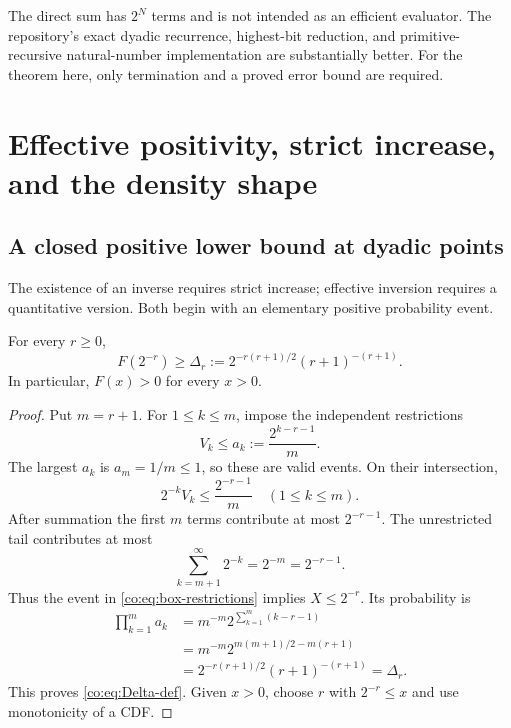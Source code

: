 \begin{remark}
The direct sum has $2^N$ terms and is not intended as an efficient evaluator.
The repository's exact dyadic recurrence, highest-bit reduction, and
primitive-recursive natural-number implementation are substantially better.
For the theorem here, only termination and a proved error bound are required.
\end{remark}

\section{Effective positivity, strict increase, and the density shape}

\subsection{A closed positive lower bound at dyadic points}

The existence of an inverse requires strict increase; effective inversion
requires a quantitative version.  Both begin with an elementary positive
probability event.

\begin{lemma}\label{co:lem:box-event}
For every $r\ge0$,
\begin{equation}\label{co:eq:Delta-def}
 F(2^{-r})\ge
 \Delta_r:=2^{-r(r+1)/2}(r+1)^{-(r+1)}.
\end{equation}
In particular, $F(x)>0$ for every $x>0$.
\end{lemma}

\begin{proof}
Put $m=r+1$.  For $1\le k\le m$, impose the independent restrictions
\begin{equation}\label{co:eq:box-restrictions}
 V_k\le a_k:=\frac{2^{k-r-1}}{m}.
\end{equation}
The largest $a_k$ is $a_m=1/m\le1$, so these are valid events.  On their
intersection,
\[
 2^{-k}V_k\le\frac{2^{-r-1}}m
 \quad(1\le k\le m).
\]
After summation the first $m$ terms contribute at most $2^{-r-1}$.  The
unrestricted tail contributes at most
\[
 \sum_{k=m+1}^{\infty}2^{-k}=2^{-m}=2^{-r-1}.
\]
Thus the event in \eqref{co:eq:box-restrictions} implies $X\le2^{-r}$.  Its
probability is
\begin{align*}
 \prod_{k=1}^{m}a_k
 &=m^{-m}2^{\sum_{k=1}^m(k-r-1)}\\
 &=m^{-m}2^{m(m+1)/2-m(r+1)}\\
 &=2^{-r(r+1)/2}(r+1)^{-(r+1)}=\Delta_r.
\end{align*}
This proves \eqref{co:eq:Delta-def}.  Given $x>0$, choose $r$ with
$2^{-r}\le x$ and use monotonicity of a CDF.
\end{proof}


